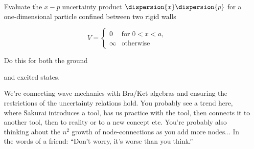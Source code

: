 \begin{question}

  Evaluate the $x-p$ uncertainty product
  $\dispersion{x}\dispersion{p}$ for a one-dimensional particle
  confined between two rigid walls

  \begin{equation}
    V =
    \begin{cases} 
      0 & \text{for } 0 < x < a,\\
      \infty & \text{otherwise}
    \end{cases}
  \end{equation}  

  \begin{questionpart}
    Do this for both the ground
  \end{questionpart}
  
  \begin{questionpart}
    and excited states.
  \end{questionpart}
\end{question}

\begin{purpose}
  We're connecting wave mechanics with Bra/Ket algebras and ensuring
  the restrictions of the uncertainty relations hold.  You probably
  see a trend here, where Sakurai introduces a tool, has us practice
  with the tool, then connects it to another tool, then to reality or
  to a new concept etc.  You're probably also thinking about the $n^2$
  growth of node-connections as you add more nodes...  In the words of
  a friend: ``Don't worry, it's worse than you think.''
\end{purpose}

